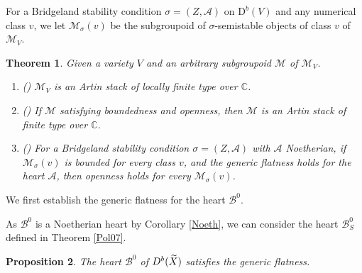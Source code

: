 \documentclass[12pt]{amsart}
\newtheorem{theorem}{Theorem}[section]
\newtheorem{proposition}[theorem]{Proposition}
\theoremstyle{definition}
\begin{document}
For a Bridgeland stability condition $\sigma=(Z,\mathcal{A})$ on $\mathrm{D}^b(V)$ and any numerical class $v$, 
we let $\mathcal{M}_{\sigma}(v)$ be the subgroupoid of $\sigma$-semistable objects of class $v$ of $\mathcal{M}_V$.

\begin{theorem}
Given a variety $V$ and an arbitrary subgroupoid $\mathcal{M}$ of $\mathcal{M}_V$.
\begin{enumerate}
    \item \textnormal{(\cite[Theorem 4.2.1]{Lie06})} $\mathcal{M}_V$ is an Artin stack of locally finite type over $\mathbb{C}$.
    \item \textnormal{(\cite[Lemma 3.4]{Tod08})}
    If $\mathcal{M}$  satisfying boundedness and openness,
    then $\mathcal{M}$ is an Artin stack of finite type over $\mathbb{C}$.
    \item \textnormal{(\cite[Theorem 3.20]{Tod08})} For a Bridgeland stability condition $\sigma=(Z,\mathcal{A})$ with $\mathcal{A}$ Noetherian, if $\mathcal{M}_{\sigma}(v)$ is bounded for every class $v$, and the generic flatness holds for the heart $\mathcal{A}$, 
    then openness holds for every $\mathcal{M}_{\sigma}(v)$.
\end{enumerate}
\end{theorem}



We first establish the generic flatness for the heart $\mathcal{B}^0$.

As $\mathcal{B}^0$ is a Noetherian heart by Corollary \ref{Noeth}, we can consider the heart $\mathcal{B}^0_S$ defined in Theorem \ref{Pol07}.
\begin{proposition}\label{genericflat}
The heart $\mathcal{B}^0$ of ${\rm D}^b(\widetilde{X})$ satisfies the generic flatness.
\end{proposition}
\end{document}
